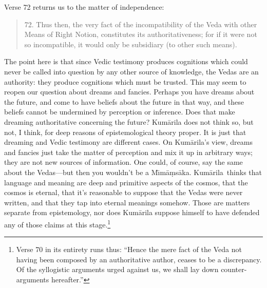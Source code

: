 \documentclass[11pt,letterpaper,oneside]{amsart}
\newenvironment{squote}{\begin{quote}\sf\small}{\rm\end{quote}} %
\newcommand{\kum}{Kum\={a}rila}
\newcommand{\mimamsaka}{M\={\i}m\=a\d ms\=aka}
\begin{document}
Verse 72 returns us to the matter of independence:\begin{squote}72. Thus then, the very fact of the incompatibility of the Veda with other Means of Right Notion, constitutes its authoritativeness; for if it were not so incompatible, it would only be subsidiary (to other such means).\end{squote} The point here is that since Vedic testimony produces cognitions which could never be called into question by any other source of knowledge, the Vedas are an authority: they produce cognitions which must be trusted. This may seem to reopen our question about dreams and fancies. Perhaps you have dreams about the future, and come to have beliefs about the future in that way, and these beliefs cannot be undermined by perception or inference. Does that make dreaming authoritative concerning the future? Kum\=arila does not think so, but not, I think, for deep reasons of epistemological theory proper. It is just that dreaming and Vedic testimony are different cases. On Kum\=arila's view, dreams and fancies just take the matter of perception and mix it up in arbitrary ways; they are not new sources of information. One could, of course, say the same about the Vedas---but then you wouldn't be a \mimamsaka. \kum\ thinks that language and meaning are deep and primitive aspects of the cosmos, that the cosmos is eternal, that it's reasonable to suppose that the Vedas were never written, and that they tap into eternal meanings somehow. Those are matters separate from epistemology, nor does Kum\=arila suppose himself to have defended any of those claims at this stage.\footnote{Verse 70 in its entirety runs thus: ``Hence the mere fact of the Veda not having been composed by an authoritative author, ceases to be a discrepancy. Of the syllogistic arguments urged against us, we shall lay down counter-arguments hereafter.''}%
\end{document}
